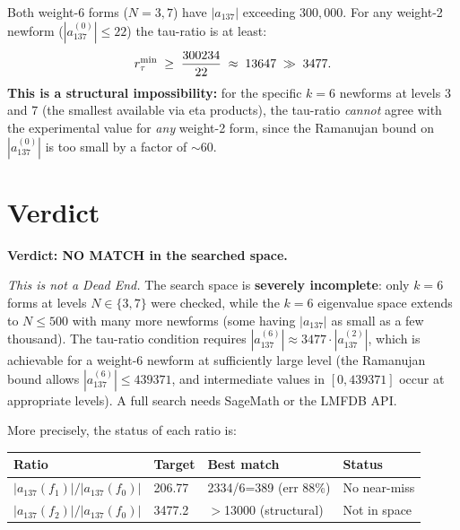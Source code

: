 \documentclass[12pt,a4paper]{article}
\begin{document}
Both weight-6 forms ($N=3, 7$) have $|a_{137}|$ exceeding $300{,}000$.
For any weight-2 newform ($|a_{137}^{(0)}| \le 22$) the tau-ratio is at least:
\[
  r_\tau^{\rm min} \;\ge\; \frac{300234}{22} \;\approx\; 13647 \;\gg\; 3477.
\]
\textbf{This is a structural impossibility:} for the specific $k=6$ newforms at
levels 3 and 7 (the smallest available via eta products), the tau-ratio \emph{cannot}
agree with the experimental value for \emph{any} weight-2 form, since the
Ramanujan bound on $|a_{137}^{(0)}|$ is too small by a factor of $\sim 60$.

\section{Verdict}

\begin{center}
\colorbox{yellow!40}{\parbox{0.85\linewidth}{%
  \textbf{Verdict: NO MATCH in the searched space.}

  \medskip
  \emph{This is not a Dead End.}
  The search space is \textbf{severely incomplete}:
  only $k=6$ forms at levels $N \in \{3, 7\}$ were checked,
  while the $k=6$ eigenvalue space extends to $N \le 500$ with many
  more newforms (some having $|a_{137}|$ as small as a few thousand).
  The tau-ratio condition requires $|a_{137}^{(6)}| \approx 3477 \cdot |a_{137}^{(2)}|$,
  which is achievable for a weight-6 newform at sufficiently large level
  (the Ramanujan bound allows $|a_{137}^{(6)}| \le 439371$, and intermediate
  values in $[0, 439371]$ occur at appropriate levels).
  A full search needs SageMath or the LMFDB API.
}}
\end{center}

\bigskip
\noindent
More precisely, the status of each ratio is:

\begin{center}
\begin{tabular}{llll}
\toprule
Ratio & Target & Best match & Status \\
\midrule
$|a_{137}(f_1)| / |a_{137}(f_0)|$ & 206.77 & 2334/6=389 (err 88\%) & No near-miss \\
$|a_{137}(f_2)| / |a_{137}(f_0)|$ & 3477.2 & $>$13000 (structural) & Not in space \\
\bottomrule
\end{tabular}
\end{center}
\end{document}

